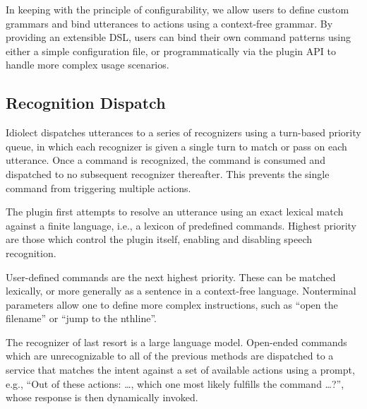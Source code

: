 \documentclass[conference]{IEEEtran}
\begin{document}
In keeping with the principle of configurability, we allow users to define custom grammars and bind utterances to actions using a context-free grammar. By providing an extensible DSL, users can bind their own command patterns using either a simple configuration file, or programmatically via the plugin API to handle more complex usage scenarios.


\subsection{Recognition Dispatch}

Idiolect dispatches utterances to a series of recognizers using a turn-based priority queue, in which each recognizer is given a single turn to match or pass on each utterance. Once a command is recognized, the command is consumed and dispatched to no subsequent recognizer thereafter. This prevents the single command from triggering multiple actions.

The plugin first attempts to resolve an utterance using an exact lexical match against a finite language, i.e., a lexicon of predefined commands. Highest priority are those which control the plugin itself, enabling and disabling speech recognition.

User-defined commands are the next highest priority. These can be matched lexically, or more generally as a sentence in a context-free language. Nonterminal parameters allow one to define more complex instructions, such as ``open the \textlangle filename'' or ``jump to the \textlangle nth\textrangle line''.


The recognizer of last resort is a large language model. Open-ended commands which are unrecognizable to all of the previous methods are dispatched to a service that matches the intent against a set of available actions using a prompt, e.g., ``Out of these actions: \ldots, which one most likely fulfills the command \ldots?'', whose response is then dynamically invoked.
\end{document}
